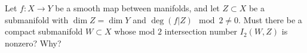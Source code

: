 Let $f:X\rightarrow Y$ be a smooth map between manifolds, and let
$Z\subset X$ be a submanifold with $\dim Z = \dim Y$ and $\deg (f|Z)
\mod 2 \neq 0$. Must there be a compact submanifold $W\subset X$ whose
mod $2$ intersection number $I_2(W,Z)$ is nonzero? Why?
